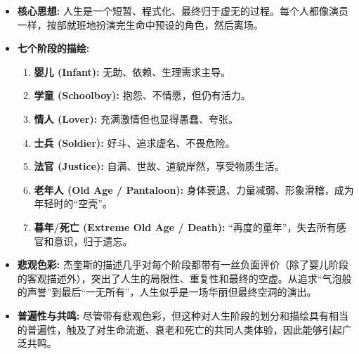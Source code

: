 \documentclass[12pt, a4paper]{article}
\begin{document}
\begin{itemize}
    \item \textbf{核心思想:} 人生是一个短暂、程式化、最终归于虚无的过程。每个人都像演员一样，按部就班地扮演完生命中预设的角色，然后离场。
    \item \textbf{七个阶段的描绘:}
        \begin{enumerate}
            \item \textbf{婴儿 (Infant):} 无助、依赖、生理需求主导。
            \item \textbf{学童 (Schoolboy):} 抱怨、不情愿，但仍有活力。
            \item \textbf{情人 (Lover):} 充满激情但也显得愚蠢、夸张。
            \item \textbf{士兵 (Soldier):} 好斗、追求虚名、不畏危险。
            \item \textbf{法官 (Justice):} 自满、世故、道貌岸然，享受物质生活。
            \item \textbf{老年人 (Old Age / Pantaloon):} 身体衰退、力量减弱、形象滑稽，成为年轻时的“空壳”。
            \item \textbf{暮年/死亡 (Extreme Old Age / Death):} “再度的童年”，失去所有感官和意识，归于遗忘。
        \end{enumerate}
    \item \textbf{悲观色彩:} 杰奎斯的描述几乎对每个阶段都带有一丝负面评价（除了婴儿阶段的客观描述外），突出了人生的局限性、重复性和最终的空虚。从追求“气泡般的声誉”到最后“一无所有”，人生似乎是一场华丽但最终空洞的演出。
    \item \textbf{普遍性与共鸣:} 尽管带有悲观色彩，但这种对人生阶段的划分和描绘具有相当的普遍性，触及了对生命流逝、衰老和死亡的共同人类体验，因此能够引起广泛共鸣。
\end{itemize}
\end{document}
